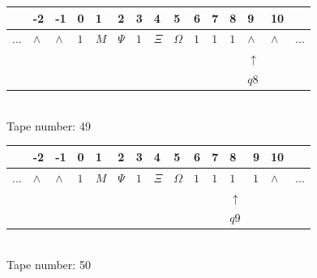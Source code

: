 \documentclass[11pt]{article}
\begin{document}
\begin{table}[H]
\centering
\begin{tabular}{lllllllllllllll}
 & -2 & -1 & 0 & 1 & 2 & 3 & 4 & 5 & 6 & 7 & 8 & 9 & 10 & \\
\hline
$...$ & \multicolumn{1}{|l|}{$\wedge$} & \multicolumn{1}{|l|}{$\wedge$} & \multicolumn{1}{|l|}{$1$} & \multicolumn{1}{|l|}{$M$} & \multicolumn{1}{|l|}{$\Psi$} & \multicolumn{1}{|l|}{$1$} & \multicolumn{1}{|l|}{$\Xi$} & \multicolumn{1}{|l|}{$\Omega$} & \multicolumn{1}{|l|}{$1$} & \multicolumn{1}{|l|}{$1$} & \multicolumn{1}{|l|}{$1$} & \multicolumn{1}{|l|}{$\wedge$} & \multicolumn{1}{|l|}{$\wedge$} & $...$\\
\hline
&  &  &  &  &  &  &  &  &  &  &  & $\uparrow$ &  &  \\
&  &  &  &  &  &  &  &  &  &  &  & $ q8 $ &  &  \\
\end{tabular}
\\
Tape number: 49
\noindent\makebox[\linewidth]{\hdashrule{\textwidth}{1pt}{1pt}}\end{table}

\begin{table}[H]
\centering
\begin{tabular}{lllllllllllllll}
 & -2 & -1 & 0 & 1 & 2 & 3 & 4 & 5 & 6 & 7 & 8 & 9 & 10 & \\
\hline
$...$ & \multicolumn{1}{|l|}{$\wedge$} & \multicolumn{1}{|l|}{$\wedge$} & \multicolumn{1}{|l|}{$1$} & \multicolumn{1}{|l|}{$M$} & \multicolumn{1}{|l|}{$\Psi$} & \multicolumn{1}{|l|}{$1$} & \multicolumn{1}{|l|}{$\Xi$} & \multicolumn{1}{|l|}{$\Omega$} & \multicolumn{1}{|l|}{$1$} & \multicolumn{1}{|l|}{$1$} & \multicolumn{1}{|l|}{$1$} & \multicolumn{1}{|l|}{$1$} & \multicolumn{1}{|l|}{$\wedge$} & $...$\\
\hline
&  &  &  &  &  &  &  &  &  &  & $\uparrow$ &  &  &  \\
&  &  &  &  &  &  &  &  &  &  & $ q9 $ &  &  &  \\
\end{tabular}
\\
Tape number: 50
\noindent\makebox[\linewidth]{\hdashrule{\textwidth}{1pt}{1pt}}\end{table}
\end{document}
